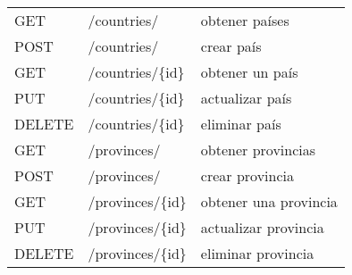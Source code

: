\begin{table}[H]
\begin{tabular}{l l l}
        \midrule
        GET             & /countries/            & obtener países               \\
        POST            & /countries/            & crear país                   \\
        GET             & /countries/\{id\}       & obtener un país              \\
        PUT             & /countries/\{id\}        & actualizar país              \\
        DELETE          & /countries/\{id\}        & eliminar país                \\
        \midrule
        GET             & /provinces/            & obtener provincias           \\
        POST            & /provinces/            & crear provincia              \\
        GET             & /provinces/\{id\}        & obtener una provincia        \\
        PUT             & /provinces/\{id\}        & actualizar provincia         \\
        DELETE          & /provinces/\{id\}        & eliminar provincia           \\
        \bottomrule
        \hline
    \end{tabular}
    \label{tab:endpoints1}
\end{table}

